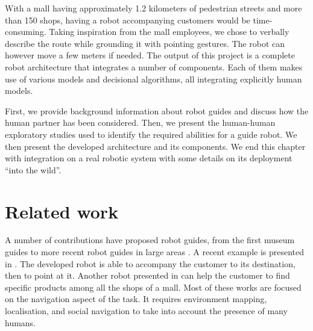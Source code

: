 With a mall having approximately 1.2 kilometers of pedestrian streets and more than 150 shops, having a robot accompanying customers would be time-consuming. Taking inspiration from the mall employees, we chose to verbally describe the route while grounding it with pointing gestures. The robot can however move a few meters if needed. %
The output of this project is a complete robot architecture that integrates a number of components. Each of them makes use of various models and decisional algorithms, all integrating explicitly human models.

First, we provide background information about robot guides and discuss how the human partner has been considered. Then, we present the human-human exploratory studies used to identify the required abilities for a guide robot. We then present the developed architecture and its components. We end this chapter with integration on a real robotic system with some details on its deployment ``into the wild''.

\section{Related work}

A number of contributions have proposed robot guides, from the first museum guides \cite{burgard_1999_museum, siegwart_2003_robox, clodic_2006_rackham} to more recent robot guides in large areas \cite{bauer_2009_autonomous, triebel_2016_spencer}. A recent example is presented in \cite{chen_2017_robots}. The developed robot is able to accompany the customer to its destination, then to point at it. Another robot presented in \cite{gross_2009_toomas} can help the customer to find specific products among all the shops of a mall. Most of these works are focused on the navigation aspect of the task. It requires environment mapping, localisation, and social navigation to take into account the presence of many humans.

